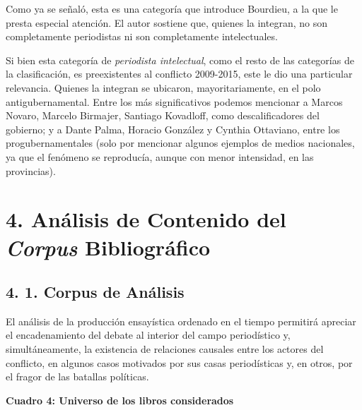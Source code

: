 Como ya se señaló, esta es una categoría que introduce Bourdieu, a la que le presta especial atención. El autor sostiene que, quienes la integran, no son completamente periodistas ni son completamente intelectuales.

Si bien esta categoría de \emph{periodista intelectual}, como el resto de las categorías de la clasificación, es preexistentes al conflicto 2009-2015, este le dio una particular relevancia. Quienes la integran se ubicaron, mayoritariamente, en el polo antigubernamental. Entre los más significativos podemos mencionar a Marcos Novaro, Marcelo Birmajer, Santiago Kovadloff, como descalificadores del gobierno; y a Dante Palma, Horacio González y Cynthia Ottaviano, entre los progubernamentales (solo por mencionar algunos ejemplos de medios nacionales, ya que el fenómeno se reproducía, aunque con menor intensidad, en las provincias).

\chapter{4. Análisis de Contenido del \emph{Corpus} Bibliográfico}

\section{4. 1. Corpus de Análisis}

El análisis de la producción ensayística ordenado en el tiempo permitirá apreciar el encadenamiento del debate al interior del campo periodístico y, simultáneamente, la existencia de relaciones causales entre los actores del conflicto, en algunos casos motivados por sus casas periodísticas y, en otros, por el fragor de las batallas políticas.

\textbf{Cuadro 4: Universo de los libros considerados}

